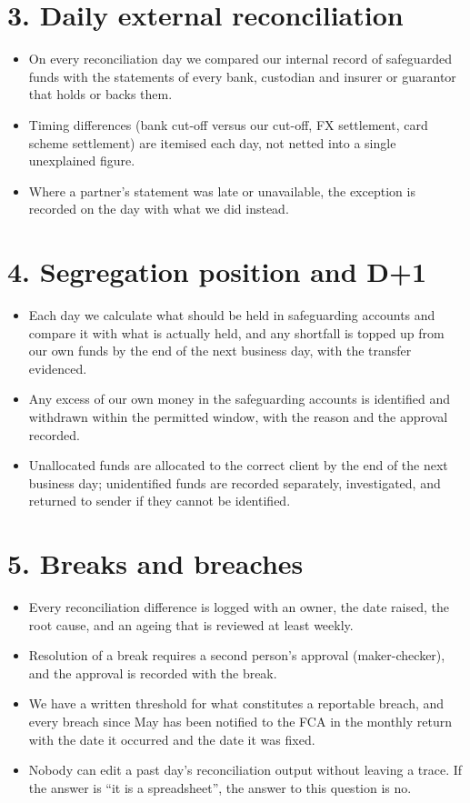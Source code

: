\documentclass[a4paper,10.5pt]{article}
\newcommand{\q}[1]{\item[$\square$] #1}
\begin{document}
\section*{3. Daily external reconciliation}
\begin{itemize}
\q{On every reconciliation day we compared our internal record of safeguarded funds with the statements of every bank, custodian and insurer or guarantor that holds or backs them.}
\q{Timing differences (bank cut-off versus our cut-off, FX settlement, card scheme settlement) are itemised each day, not netted into a single unexplained figure.}
\q{Where a partner's statement was late or unavailable, the exception is recorded on the day with what we did instead.}
\end{itemize}

\section*{4. Segregation position and D+1}
\begin{itemize}
\q{Each day we calculate what should be held in safeguarding accounts and compare it with what is actually held, and any shortfall is topped up from our own funds by the end of the next business day, with the transfer evidenced.}
\q{Any excess of our own money in the safeguarding accounts is identified and withdrawn within the permitted window, with the reason and the approval recorded.}
\q{Unallocated funds are allocated to the correct client by the end of the next business day; unidentified funds are recorded separately, investigated, and returned to sender if they cannot be identified.}
\end{itemize}

\section*{5. Breaks and breaches}
\begin{itemize}
\q{Every reconciliation difference is logged with an owner, the date raised, the root cause, and an ageing that is reviewed at least weekly.}
\q{Resolution of a break requires a second person's approval (maker-checker), and the approval is recorded with the break.}
\q{We have a written threshold for what constitutes a reportable breach, and every breach since May has been notified to the FCA in the monthly return with the date it occurred and the date it was fixed.}
\q{Nobody can edit a past day's reconciliation output without leaving a trace. If the answer is ``it is a spreadsheet'', the answer to this question is no.}
\end{itemize}
\end{document}
